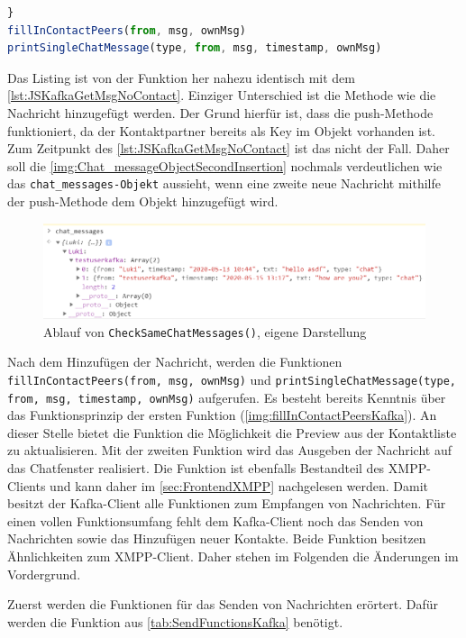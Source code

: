 \documentclass[a4paper,titlepage,halfparskip,12pt]{scrreprt}
\begin{document}
\begin{onehalfspacing}
\begin{lstlisting}[language=Javascript,caption=Weitere Verarbeitung der Nachricht,label={lst:JSKafkaNoSameMsg}]
}
fillInContactPeers(from, msg, ownMsg)
printSingleChatMessage(type, from, msg, timestamp, ownMsg)
\end{lstlisting}
Das Listing ist von der Funktion her nahezu identisch mit dem \autoref{lst:JSKafkaGetMsgNoContact}. Einziger Unterschied ist die Methode wie die Nachricht hinzugefügt werden. Der Grund hierfür ist, dass die push-Methode funktioniert, da der Kontaktpartner bereits als Key im Objekt vorhanden ist. Zum Zeitpunkt des \autoref{lst:JSKafkaGetMsgNoContact} ist das nicht der Fall. Daher soll die \autoref{img:Chat_messageObjectSecondInsertion} nochmals verdeutlichen wie das \texttt{chat\_messages-Objekt} aussieht, wenn eine zweite neue Nachricht mithilfe der push-Methode dem Objekt hinzugefügt wird.
\begin{figure}[h]
	\centering
	\includegraphics[scale=1.0]{images/Chat_messageObjectSecondInsertion}
	\caption{Ablauf von \texttt{CheckSameChatMessages()}, eigene Darstellung}
	\label{img:Chat_messageObjectSecondInsertion}
\end{figure}
Nach dem Hinzufügen der Nachricht, werden die Funktionen \texttt{fillInContactPeers(from, msg, ownMsg)} und \texttt{printSingleChatMessage(type, from, msg, timestamp, ownMsg)} aufgerufen. Es besteht bereits Kenntnis über das Funktionsprinzip der ersten Funktion (\autoref{img:fillInContactPeersKafka}). An dieser Stelle bietet die Funktion die Möglichkeit die Preview aus der Kontaktliste zu aktualisieren. Mit der zweiten Funktion wird das Ausgeben der Nachricht auf das Chatfenster realisiert. Die Funktion ist ebenfalls Bestandteil des XMPP-Clients und kann daher im \autoref{sec:FrontendXMPP} nachgelesen werden. Damit besitzt der Kafka-Client alle Funktionen zum Empfangen von Nachrichten. Für einen vollen Funktionsumfang fehlt dem Kafka-Client noch das Senden von Nachrichten sowie das Hinzufügen neuer Kontakte. Beide Funktion besitzen Ähnlichkeiten zum XMPP-Client. Daher stehen im Folgenden die Änderungen im Vordergrund.

\pagebreak

Zuerst werden die Funktionen für das Senden von Nachrichten erörtert. Dafür werden die Funktion aus \autoref{tab:SendFunctionsKafka} benötigt.


\end{onehalfspacing}
\end{document}
